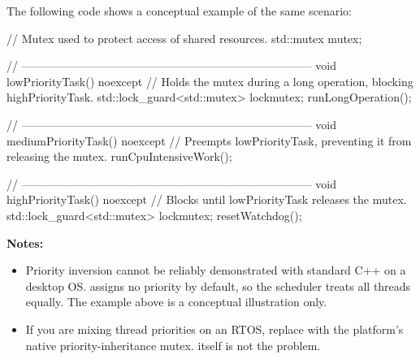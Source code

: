
The following code shows a conceptual example of the same scenario:

\begin{cppcode}
// Mutex used to protect access of shared resources.
std::mutex mutex{};

// -----------------------------------------------------------------------------
void lowPriorityTask() noexcept
{
    // Holds the mutex during a long operation, blocking highPriorityTask.
    std::lock_guard<std::mutex> lock{mutex};
    runLongOperation();
}

// -----------------------------------------------------------------------------
void mediumPriorityTask() noexcept
{
    // Preempts lowPriorityTask, preventing it from releasing the mutex.
    runCpuIntensiveWork();
}

// -----------------------------------------------------------------------------
void highPriorityTask() noexcept
{
    // Blocks until lowPriorityTask releases the mutex.
    std::lock_guard<std::mutex> lock{mutex};
    resetWatchdog();
}
\end{cppcode}

\begin{aside}
\textbf{Notes:}
\begin{itemize}
  \item Priority inversion cannot be reliably demonstrated with standard C++ on a desktop OS.
     assigns no priority by default, so the scheduler treats all threads equally.
    The example above is a conceptual illustration only.
  \item If you are mixing thread priorities on an RTOS, replace  with the
    platform's native priority-inheritance mutex.  itself is not the problem.
\end{itemize}
\end{aside}

